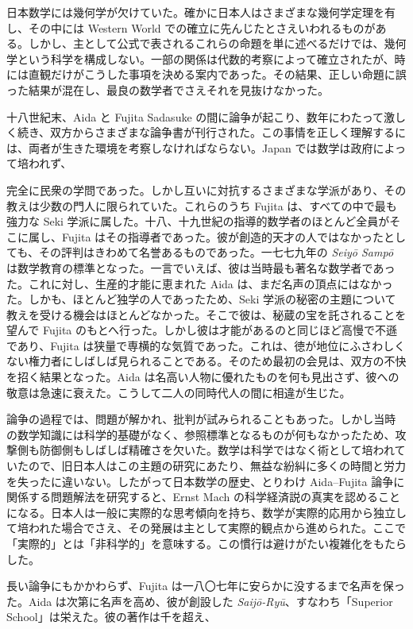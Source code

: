 \documentclass[11pt]{article}
\newcommand{\scanpage}[2]{\clearpage\setcounter{footnote}{0}\noindent{\footnotesize\color{gray}PDF #1 頁 · #2}\par\medskip}
\newcommand{\scanfooter}{}
\begin{document}
日本数学には幾何学が欠けていた。確かに日本人はさまざまな幾何学定理を有し、その中には Western World での確立に先んじたとさえいわれるものがある。しかし、主として公式で表されるこれらの命題を単に述べるだけでは、幾何学という科学を構成しない。一部の関係は代数的考察によって確立されたが、時には直観だけがこうした事項を決める案内であった。その結果、正しい命題に誤った結果が混在し、最良の数学者でさえそれを見抜けなかった。

十八世紀末、Aida と Fujita Sadasuke の間に論争が起こり、数年にわたって激しく続き、双方からさまざまな論争書が刊行された。この事情を正しく理解するには、両者が生きた環境を考察しなければならない。Japan では数学は政府によって培われず、
\scanfooter

\scanpage{0183}{第22章、印刷頁169}
完全に民衆の学問であった。しかし互いに対抗するさまざまな学派があり、その教えは少数の門人に限られていた。これらのうち Fujita は、すべての中で最も強力な Seki 学派に属した。十八、十九世紀の指導的数学者のほとんど全員がそこに属し、Fujita はその指導者であった。彼が創造的天才の人ではなかったとしても、その評判はきわめて名誉あるものであった。一七七九年の \emph{Seiyō Sampō} は数学教育の標準となった。一言でいえば、彼は当時最も著名な数学者であった。これに対し、生産的才能に恵まれた Aida は、まだ名声の頂点にはなかった。しかも、ほとんど独学の人であったため、Seki 学派の秘密の主題について教えを受ける機会はほとんどなかった。そこで彼は、秘蔵の宝を託されることを望んで Fujita のもとへ行った。しかし彼は才能があるのと同じほど高慢で不遜であり、Fujita は狭量で専横的な気質であった。これは、徳が地位にふさわしくない権力者にしばしば見られることである。そのため最初の会見は、双方の不快を招く結果となった。Aida は名高い人物に優れたものを何も見出さず、彼への敬意は急速に衰えた。こうして二人の同時代人の間に相違が生じた。

論争の過程では、問題が解かれ、批判が試みられることもあった。しかし当時の数学知識には科学的基礎がなく、参照標準となるものが何もなかったため、攻撃側も防御側もしばしば精確さを欠いた。数学は科学ではなく術として培われていたので、旧日本人はこの主題の研究にあたり、無益な紛糾に多くの時間と労力を失ったに違いない。したがって日本数学の歴史、とりわけ Aida--Fujita 論争に関係する問題解法を研究すると、Ernst Mach の科学経済説の真実を認めることになる。日本人は一般に実際的な思考傾向を持ち、数学が実際的応用から独立して培われた場合でさえ、その発展は主として実際的観点から進められた。ここで「実際的」とは「非科学的」を意味する。この慣行は避けがたい複雑化をもたらした。

長い論争にもかかわらず、Fujita は一八〇七年に安らかに没するまで名声を保った。Aida は次第に名声を高め、彼が創設した \emph{Saijō-Ryū}、すなわち「Superior School」は栄えた。彼の著作は千を超え、
\scanfooter
\end{document}
